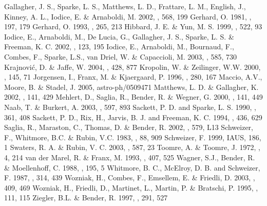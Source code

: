 \documentclass[12pt,preprint]{aastex}
\begin{document}
\begin{thebibliography}{}
 Gallagher, J. S., Sparke, L. S., Matthews, L. D., Frattare, L. M., English, J., Kinney, A. L., Iodice, E. \& Arnaboldi, M. 2002, \apj, 568, 199
 Gerhard, O. 1981, \mnras, 197, 179
 Gerhard, O. 1993, \mnras, 265, 213
 Hibbard, J. E. \& Yun, M. S.  1999, \apjl, 522, 93
 Iodice, E., Arnaboldi, M., De Lucia, G., Gallagher, J. S., Sparke, L. S. \& Freeman, K. C.  2002, \aj, 123, 195
 Iodice, E., Arnaboldi, M., Bournaud, F., Combes, F., Sparke, L.S., van Driel, W. \& Capaccioli, M. 2003, \apj, 585, 730
 Krajnovi\'{c}, D. \& Jaffe, W. 2004, \aap, 428, 877
 Kropolin, W. \& Zeilinger, W.W. 2000, \aaps, 145, 71
 Jorgensen, I., Franx, M. \& Kjaergaard, P. 1996, \mnras, 280, 167 
 Maccio, A.V., Moore, B. \& Stadel, J. 2005, astro-ph/0509471
 Matthews, L. D. \& Gallagher, K. 2002, \apjs, 141, 429
 Mehlert, D., Saglia, R., Bender, R. \& Wegner, G. 2000, \aaps, 141, 449
 Naab, T. \& Burkert, A. 2003, \apj, 597, 893 
 Sackett, P. D. and Sparke, L. S. 1990, \apj, 361, 408
 Sackett, P. D., Rix, H., Jarvis, B. J. and Freeman, K. C. 1994, \apj, 436, 629
 Saglia, R., Maraston, C., Thomas, D. \& Bender, R. 2002, \apjl, 579, L13
 Schweizer, F., Whitmore, B.C. \& Rubin, V.C. 1983, \aj, 88, 909
 Schweizer, F.  1999, IAUS, 186, 1
 Swaters, R. A. \& Rubin, V. C. 2003, \apjl, 587, 23
 Toomre, A. \& Toomre, J. 1972, \baas, 4, 214
 van der Marel, R. \& Franx, M. 1993, \apj, 407, 525
 Wagner, S.J., Bender, R. \& Moellenhoff, C. 1988, \aap, 195, 5
 Whitmore, B. C., McElroy, D. B. and Schweizer, F. 1987, \apj, 314, 439
 Wozniak, H., Combes, F., Emsellem, E. \& Friedli, D. 2003, \aap, 409, 469
 Wozniak, H.,  Friedli, D., Martinet, L., Martin, P. \& Bratschi, P. 1995, \aaps, 111, 115
 Ziegler, B.L. \& Bender, R. 1997, \mnras, 291, 527 
 
\end{thebibliography}
\end{document}
